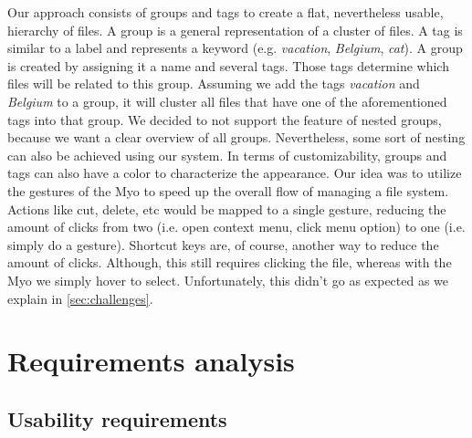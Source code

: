 \documentclass{article}
\begin{document}
Our approach consists of groups and tags to create a flat, nevertheless usable, hierarchy of files. A group is a general representation of a cluster of files. A tag is similar to a label and represents a keyword (e.g. \textit{vacation}, \textit{Belgium}, \textit{cat}). A group is created by assigning it a name and several tags. Those tags determine which files will be related to this group. Assuming we add the tags \textit{vacation} and \textit{Belgium} to a group, it will cluster all files that have one of the aforementioned tags into that group. We decided to not support the feature of nested groups, because we want a clear overview of all groups. Nevertheless, some sort of nesting can also be achieved using our system. In terms of customizability, groups and tags can also have a color to characterize the appearance. Our idea was to utilize the gestures of the Myo to speed up the overall flow of managing a file system. Actions like cut, delete, etc would be mapped to a single gesture, reducing the amount of clicks from two (i.e. open context menu, click menu option) to one (i.e. simply do a gesture). Shortcut keys are, of course, another way to reduce the amount of clicks. Although, this still requires clicking the file, whereas with the Myo we simply hover to select. Unfortunately, this didn't go as expected as we explain in \ref{sec:challenges}.

\section{Requirements analysis}

\subsection{Usability requirements}
\end{document}
